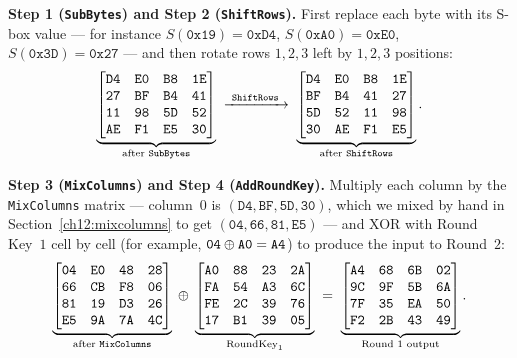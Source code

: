 \textbf{Step 1 (\texttt{SubBytes}) and Step 2 (\texttt{ShiftRows}).} First replace
each byte with its S-box value --- for instance $S(\mathtt{0x19})=\mathtt{0xD4}$,
$S(\mathtt{0xA0})=\mathtt{0xE0}$, $S(\mathtt{0x3D})=\mathtt{0x27}$ --- and then
rotate rows $1,2,3$ left by $1,2,3$ positions:
\[
\underbrace{
\begin{bmatrix}
\mathtt{D4} & \mathtt{E0} & \mathtt{B8} & \mathtt{1E}\\
\mathtt{27} & \mathtt{BF} & \mathtt{B4} & \mathtt{41}\\
\mathtt{11} & \mathtt{98} & \mathtt{5D} & \mathtt{52}\\
\mathtt{AE} & \mathtt{F1} & \mathtt{E5} & \mathtt{30}
\end{bmatrix}
}_{\text{after \texttt{SubBytes}}}
\;\xrightarrow{\ \texttt{ShiftRows}\ }\;
\underbrace{
\begin{bmatrix}
\mathtt{D4} & \mathtt{E0} & \mathtt{B8} & \mathtt{1E}\\
\mathtt{BF} & \mathtt{B4} & \mathtt{41} & \mathtt{27}\\
\mathtt{5D} & \mathtt{52} & \mathtt{11} & \mathtt{98}\\
\mathtt{30} & \mathtt{AE} & \mathtt{F1} & \mathtt{E5}
\end{bmatrix}
}_{\text{after \texttt{ShiftRows}}}.
\]

\textbf{Step 3 (\texttt{MixColumns}) and Step 4 (\texttt{AddRoundKey}).} Multiply
each column by the \texttt{MixColumns} matrix --- column~$0$ is
$(\mathtt{D4},\mathtt{BF},\mathtt{5D},\mathtt{30})$, which we mixed by hand in
Section~\ref{ch12:mixcolumns} to get $(\mathtt{04},\mathtt{66},\mathtt{81},\mathtt{E5})$
--- and XOR with Round Key~$1$ cell by cell (for example,
$\mathtt{04}\oplus\mathtt{A0}=\mathtt{A4}$) to produce the input to Round~$2$:
\[
\underbrace{
\begin{bmatrix}
\mathtt{04} & \mathtt{E0} & \mathtt{48} & \mathtt{28}\\
\mathtt{66} & \mathtt{CB} & \mathtt{F8} & \mathtt{06}\\
\mathtt{81} & \mathtt{19} & \mathtt{D3} & \mathtt{26}\\
\mathtt{E5} & \mathtt{9A} & \mathtt{7A} & \mathtt{4C}
\end{bmatrix}
}_{\text{after \texttt{MixColumns}}}
\;\oplus\;
\underbrace{
\begin{bmatrix}
\mathtt{A0} & \mathtt{88} & \mathtt{23} & \mathtt{2A}\\
\mathtt{FA} & \mathtt{54} & \mathtt{A3} & \mathtt{6C}\\
\mathtt{FE} & \mathtt{2C} & \mathtt{39} & \mathtt{76}\\
\mathtt{17} & \mathtt{B1} & \mathtt{39} & \mathtt{05}
\end{bmatrix}
}_{\text{RoundKey}_1}
\;=\;
\underbrace{
\begin{bmatrix}
\mathtt{A4} & \mathtt{68} & \mathtt{6B} & \mathtt{02}\\
\mathtt{9C} & \mathtt{9F} & \mathtt{5B} & \mathtt{6A}\\
\mathtt{7F} & \mathtt{35} & \mathtt{EA} & \mathtt{50}\\
\mathtt{F2} & \mathtt{2B} & \mathtt{43} & \mathtt{49}
\end{bmatrix}
}_{\text{Round~$1$ output}}.
\]

